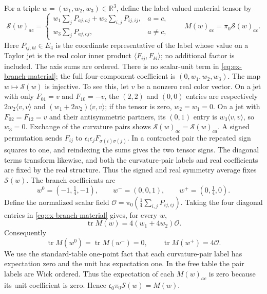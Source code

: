 For a triple $w=(w_1,w_2,w_3)\in\mathbb R^3$, define the label-valued
material tensor by
\begin{equation}
 \mathcal S(w)_{ac}=\begin{cases}
 w_1\sum_j P_{aj,aj}+w_2\sum_{i,j}P_{ij,ij},&a=c,\\
 w_3\sum_j P_{aj,cj},&a\ne c,
 \end{cases}
 \qquad
 M(w)_{ac}=\pi_0\mathcal S(w)_{ac}.
 \label{eq:ex-branch-material}
\end{equation}
Here $P_{ij,kl}\in E_4$ is the coordinate representative of the label
whose value on a Taylor jet is the real color inner product
$\langle F_{ij},F_{kl}\rangle$; no additional factor is included. The
axis sums are ordered. There is no
scalar-unit term in \eqref{eq:ex-branch-material}; the full four-component
coefficient is $(0,w_1,w_2,w_3)$. The map $w\mapsto\mathcal S(w)$ is
injective. To see this, let $v$ be a nonzero real color vector. On a jet
with only $F_{01}=v$ and $F_{10}=-v$, the $(2,2)$ and $(0,0)$ entries
are respectively $2w_2\langle v,v\rangle$ and
$(w_1+2w_2)\langle v,v\rangle$; if the tensor is zero, $w_2=w_1=0$.
On a jet with $F_{02}=F_{12}=v$ and their antisymmetric partners, its
$(0,1)$ entry is $w_3\langle v,v\rangle$, so $w_3=0$. Exchange of the
curvature pairs shows $\mathcal S(w)_{ac}=\mathcal S(w)_{ca}$. A signed
permutation sends $F_{ij}$ to $\epsilon_i\epsilon_jF_{\sigma(i)\sigma(j)}$.
In a contracted pair the repeated sign squares to one, and reindexing the
sums gives the two tensor signs. The diagonal terms transform likewise, and
both the curvature-pair labels and real coefficients are fixed by the real structure. Thus the signed and real
symmetry average fixes $\mathcal S(w)$. The branch coefficients are
\begin{equation}
 w^0=(-1,\tfrac14,-1),\qquad
 w^-=(0,0,1),\qquad w^+=(0,\tfrac14,0).
 \label{eq:ex-branch-coefficients}
\end{equation}
Define the normalized scalar field
$\mathcal O=\pi_0(\tfrac14\sum_{i,j}P_{ij,ij})$. Taking the four
diagonal entries in \eqref{eq:ex-branch-material} gives, for every $w$,
\begin{equation}
 \operatorname{tr} M(w)=4(w_1+4w_2)\mathcal O.
 \label{eq:ex-branch-material-trace}
\end{equation}
Consequently
\begin{equation}
 \operatorname{tr}M(w^0)=\operatorname{tr}M(w^-)=0,\qquad
 \operatorname{tr}M(w^+)=4\mathcal O.
 \label{eq:ex-branch-three-traces}
\end{equation}
We use the standard-table one-point fact that each curvature-pair label
has expectation zero and the unit has expectation one. In the free table
the pair labels are Wick ordered. Thus the expectation of each
$M(w)_{ac}$ is zero because its unit coefficient is zero.
Hence $\mathfrak c_0\pi_0\mathcal S(w)=M(w)$.

